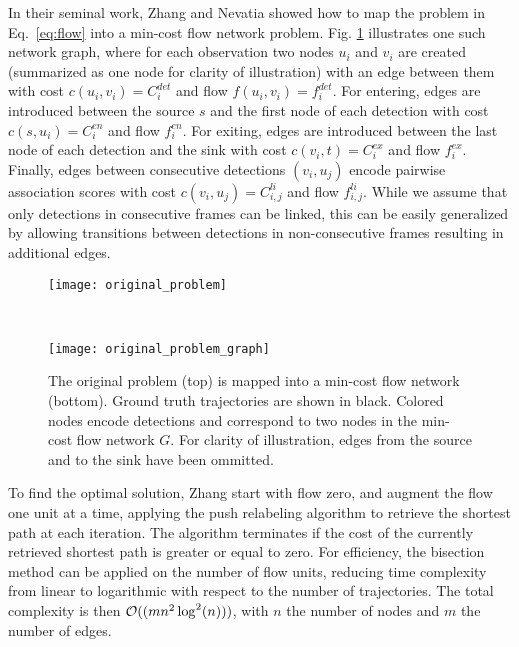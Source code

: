 \documentclass[10pt,twocolumn,letterpaper]{article}
\renewcommand{\eqref}[1]{Eq.~\ref{#1}}
\begin{document}
In their seminal work, Zhang and Nevatia \cite{Zhang2008CVPR}  showed how to map the problem in \eqref{eq:flow} into a min-cost flow network problem. Fig. \ref{fig:problem_mapping} illustrates one such network graph, where for each observation two nodes $u_i$ and $v_i$ are created (summarized as one node for clarity of illustration) with an edge between them with cost $c(u_i,v_i)=C^{det}_i$ and flow $f(u_i,v_i) = f^{det}_i$.
For entering, edges are introduced between the source $s$ and the first node of each detection with cost $c(s,u_i)=C^{en}_i$ and flow $f^{en}_i$.
For exiting, edges are introduced  between the last node of each detection and the sink with cost $c(v_i,t)=C^{ex}_i$ and flow $f^{ex}_i$.
Finally, edges between consecutive detections $(v_i, u_j)$ encode pairwise association scores with cost $c(v_i,u_j) = C^{li}_{i,j}$ and flow $f^{li}_{i,j}$. 
While we assume that only detections in consecutive frames can be linked, this can be easily generalized by allowing transitions between detections in non-consecutive frames resulting in additional edges.
 
\begin{figure}[t!]
  \centering
  \begin{minipage}[b]{0.9\linewidth}
    \texttt{[image: original\_problem]}
  \end{minipage}\\
\vspace{0.2cm}
  \begin{minipage}[b]{0.9\linewidth}
    \texttt{[image: original\_problem\_graph]}
  \end{minipage}
  \caption{The original problem (top) is mapped into a min-cost flow network (bottom). Ground truth trajectories are shown in black. Colored nodes encode detections and correspond to two nodes in the min-cost flow network $G$. For clarity of illustration, edges from the source and to the sink have been ommitted.}
  \label{fig:problem_mapping}
\vspace{0.3cm}
\end{figure}

To find the optimal solution, Zhang \etal \cite{Zhang2008CVPR} start with flow zero, and augment the flow one unit at a time, applying the push relabeling algorithm \cite{Goldberg1997JA} to retrieve the shortest path at each iteration. The algorithm terminates if the cost of the currently retrieved shortest path is greater or equal to zero.
For efficiency, the bisection method can be applied on the number of flow units, reducing time complexity from linear to logarithmic with respect to the number of trajectories. The total complexity is then  ${\cal O}((mn^2\log^2(n)))$, with $n$ the number of nodes and $m$ the number of edges. 
\end{document}
